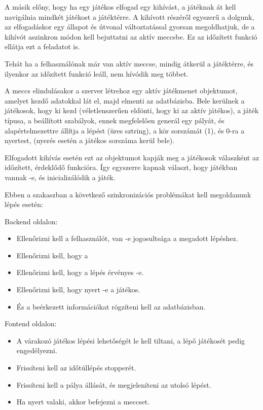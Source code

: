 A másik előny, hogy ha egy játékos elfogad egy kihívást, a játéknak át kell navigálnia mindkét játékost a játéktérre. A kihívott részéről egyszerű a dolgunk, az elfogadáskor egy állapot és útvonal változtatással gyorsan megoldhatjuk, de a kihívót aszinkron módon kell bejuttatni az aktív meccsbe. Ez az időzített funkció ellátja ezt a feladatot is.

Tehát ha a felhasználónak már van aktív meccse, mindig átkerül a játéktérre, és ilyenkor az időzített funkció leáll, nem hívódik meg többet.

A meccs elindulásakor a szerver létrehoz egy aktív játékmenet objektumot, amelyet kezdő adatokkal lát el, majd elmenti az adatbázisba. Bele kerülnek a játékosok, hogy ki kezd (véletlenszerűen eldönti, hogy ki az aktív játékos), a játék típusa, a beállított szabályok, ennek megfelelően generál egy pályát, és alapértelmezettre állítja a lépést (üres sztring), a kör sorszámát (1), és 0-ra a nyertest, (nyerés esetén a játékos sorszáma kerül bele).

Elfogadott kihívás esetén ezt az objektumot kapják meg a játékosok válaszként az időzített, érdeklődő funkcióra. Így egyszerre kapnak választ, hogy játékban vannak -e, és inicializálódik a játék.

Ebben a szakaszban a következő szinkronizációs problémákat kell megoldanunk lépés esetén:

Backend oldalon:
\begin{itemize}
	\item Ellenőrizni kell a felhasználót, van -e jogosultsága a megadott lépéshez.
	\item Ellenőrizni kell, hogy a
	\item Ellenőrizni kell, hogy a lépés érvényes -e.
	\item Ellenőrizni kell, hogy nyert -e a játékos.
	\item És a beérkezett információkat rögzíteni kell az adatbázisban.
\end{itemize}

Fontend oldalon:
\begin{itemize}
	\item A várakozó játékos lépési lehetőségét le kell tiltani, a lépő játékosét pedig engedélyezni.
	\item Frissíteni kell az időtúllépés stopperét.
	\item Frissíteni kell a pálya állását, és megjeleníteni az utolsó lépést.
	\item Ha nyert valaki, akkor befejezni a meccset.
\end{itemize}

